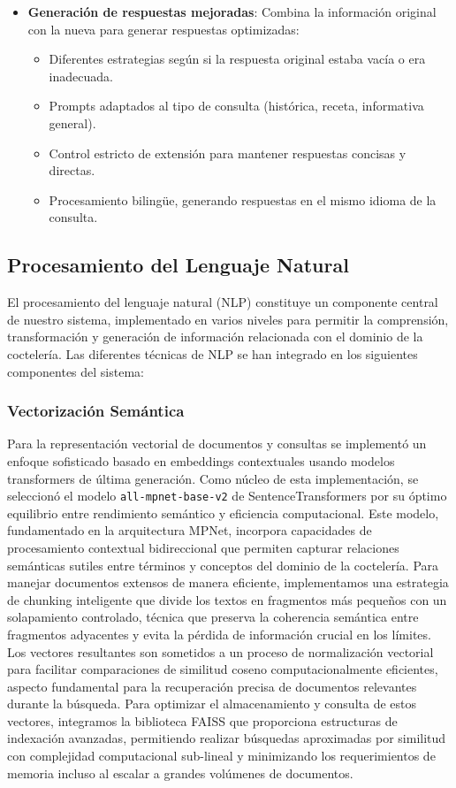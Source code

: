 \documentclass[runningheads]{llncs}
\begin{document}
\begin{itemize}
    \item \textbf{Generación de respuestas mejoradas}: Combina la información original con la nueva para generar respuestas optimizadas:
    \begin{itemize}
        \item Diferentes estrategias según si la respuesta original estaba vacía o era inadecuada.
        \item Prompts adaptados al tipo de consulta (histórica, receta, informativa general).
        \item Control estricto de extensión para mantener respuestas concisas y directas.
        \item Procesamiento bilingüe, generando respuestas en el mismo idioma de la consulta.
    \end{itemize}
\end{itemize}
\subsection{Procesamiento del Lenguaje Natural}

El procesamiento del lenguaje natural (NLP) constituye un componente central de nuestro sistema, implementado en varios niveles para permitir la comprensión, transformación y generación de información relacionada con el dominio de la coctelería. Las diferentes técnicas de NLP se han integrado en los siguientes componentes del sistema:

\subsubsection{Vectorización Semántica}

Para la representación vectorial de documentos y consultas se implementó un enfoque sofisticado basado en embeddings contextuales usando modelos transformers de última generación. Como núcleo de esta implementación, se seleccionó el modelo \texttt{all-mpnet-base-v2} de SentenceTransformers por su óptimo equilibrio entre rendimiento semántico y eficiencia computacional. Este modelo, fundamentado en la arquitectura MPNet, incorpora capacidades de procesamiento contextual bidireccional que permiten capturar relaciones semánticas sutiles entre términos y conceptos del dominio de la coctelería. Para manejar documentos extensos de manera eficiente, implementamos una estrategia de chunking inteligente que divide los textos en fragmentos más pequeños con un solapamiento controlado, técnica que preserva la coherencia semántica entre fragmentos adyacentes y evita la pérdida de información crucial en los límites. Los vectores resultantes son sometidos a un proceso de normalización vectorial para facilitar comparaciones de similitud coseno computacionalmente eficientes, aspecto fundamental para la recuperación precisa de documentos relevantes durante la búsqueda. Para optimizar el almacenamiento y consulta de estos vectores, integramos la biblioteca FAISS que proporciona estructuras de indexación avanzadas, permitiendo realizar búsquedas aproximadas por similitud con complejidad computacional sub-lineal y minimizando los requerimientos de memoria incluso al escalar a grandes volúmenes de documentos.
\end{document}
